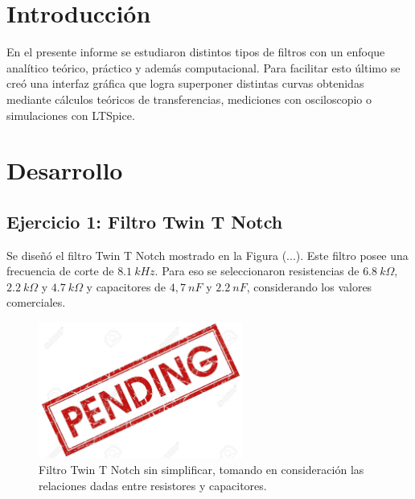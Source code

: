\documentclass[a4paper]{article}
\begin{document}




\section{Introducción}

En el presente informe se estudiaron distintos tipos de filtros con un enfoque analítico teórico, práctico y además computacional. Para facilitar esto último se creó una interfaz gráfica que logra superponer distintas curvas obtenidas mediante cálculos teóricos de transferencias, mediciones con osciloscopio o simulaciones con LTSpice.

\section{Desarrollo}

\subsection{Ejercicio 1: Filtro Twin T Notch}

Se diseñó el filtro Twin T Notch mostrado en la Figura (...). Este filtro posee una frecuencia de corte de $ 8.1 \ kHz $. Para eso se seleccionaron resistencias de $ 6.8 \ k\Omega $, $ 2.2 \ k\Omega $ y $ 4.7 \ k\Omega $ y capacitores de $ 4,7 \ nF $ y $ 2.2 \ nF $, considerando los valores comerciales.

\begin{figure}[H]
	\centering
	\includegraphics[width=0.6\textwidth]{pend.jpg}
\caption{Filtro Twin T Notch sin simplificar, tomando en consideración las relaciones dadas entre resistores y capacitores.}
	\label{fig:simu2}
\end{figure}
\end{document}
